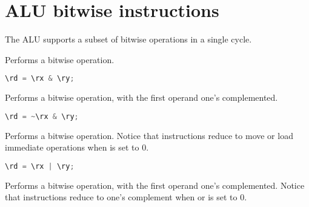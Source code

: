 
\section{ALU bitwise instructions}


The \rvex{} ALU supports a subset of bitwise operations in a single cycle.

Performs a bitwise  operation.

\begin{lstlisting}[numbers=none, basicstyle=\ttfamily\footnotesize, language=C++]
\rd = \rx & \ry;
\end{lstlisting}

Performs a bitwise  operation, with the first operand one's
complemented.

\begin{lstlisting}[numbers=none, basicstyle=\ttfamily\footnotesize, language=C++]
\rd = ~\rx & \ry;
\end{lstlisting}

Performs a bitwise  operation. Notice that  instructions
reduce to move or load immediate operations when  is set to 0.

\begin{lstlisting}[numbers=none, basicstyle=\ttfamily\footnotesize, language=C++]
\rd = \rx | \ry;
\end{lstlisting}

Performs a bitwise  operation, with the first operand one's
complemented. Notice that  instructions reduce to one's complement
when  or  is set to 0.

